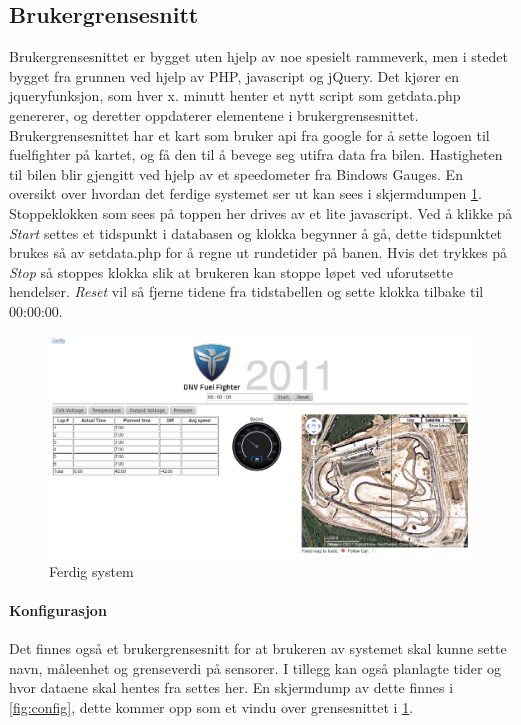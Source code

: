 \subsection{Brukergrensesnitt}
Brukergrensesnittet er bygget uten hjelp av noe spesielt rammeverk, men i stedet bygget fra grunnen ved hjelp av PHP, javascript og jQuery\cite{jquery}. Det kjører en jqueryfunksjon, som hver x. minutt henter et nytt script som getdata.php genererer, og deretter oppdaterer elementene i brukergrensesnittet. Brukergrensesnittet har et kart som bruker api fra google for å sette logoen til fuelfighter på kartet, og få den til å bevege seg utifra data fra bilen. Hastigheten til bilen blir gjengitt ved hjelp av et speedometer fra Bindows Gauges\cite{bindows}. En oversikt over hvordan det ferdige systemet ser ut kan sees i skjermdumpen \ref{fig:gui}. Stoppeklokken som sees på toppen her drives av et lite javascript. Ved å klikke på {\em Start} settes et tidspunkt i databasen og klokka begynner å gå, dette tidspunktet brukes så av setdata.php for å regne ut rundetider på banen. Hvis det trykkes på {\em Stop} så stoppes klokka slik at brukeren kan stoppe løpet ved uforutsette hendelser. {\em Reset} vil så fjerne tidene fra tidstabellen og sette klokka tilbake til 00:00:00.

\begin{figure}[H]
\includegraphics[width=\textwidth]{images/gui.png}
\caption{Ferdig system} 
\label{fig:gui}
\end{figure}

\paragraph{Konfigurasjon}
Det finnes også et brukergrensesnitt for at brukeren av systemet skal kunne sette navn, måleenhet og grenseverdi på sensorer. I tillegg kan også planlagte tider og hvor dataene skal hentes fra settes her.
En skjermdump av dette finnes i \ref{fig:config}, dette kommer opp som et vindu over grensesnittet i \ref{fig:gui}.

